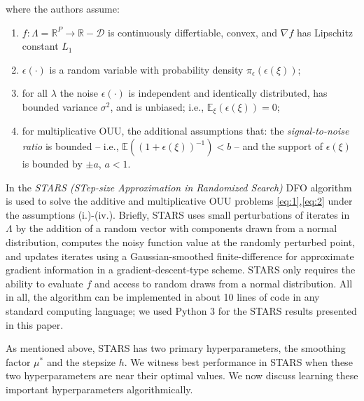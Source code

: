 \documentclass{amsart}
\newcommand{\D}{\mathcal{D}}
\newcommand{\R}{\mathbb{R}}
\begin{document}
\noindent where the authors assume:

\begin{enumerate}[(i.)]

\item $f: \Lambda=\R^P \to \R-\D$ is continuously differtiable, convex, and $\nabla f$ has Lipschitz constant $L_1$

\item $\epsilon(\cdot)$ is a random variable with probability density $\pi_{\epsilon}(\epsilon(\xi))$;

\item for all $\lambda$ the noise $\epsilon(\cdot)$ is independent and identically distributed, has bounded variance $\sigma^2$, and is unbiased; i.e., $\mathbb{E}_\xi (\epsilon(\xi))=0$;

\item for multiplicative OUU, the additional assumptions that: the \textit{signal-to-noise ratio} is bounded -- i.e., $\mathbb{E}((1+\epsilon(\xi))^{-1})<b$ -- and the support of $\epsilon(\xi)$ is bounded by $\pm a$, $a<1.$

\end{enumerate}




In \cite{CW} the \textit{STARS (STep-size Approximation in Randomized Search)} DFO algorithm is used to solve the additive and multiplicative OUU problems \eqref{eq:1},\eqref{eq:2} under the  assumptions (i.)-(iv.). Briefly, STARS uses small perturbations of iterates in $\Lambda$ by the addition of a random vector with components drawn from a normal distribution, computes the noisy function value at the randomly perturbed point, and updates iterates using a Gaussian-smoothed finite-difference for approximate gradient information in a gradient-descent-type scheme. STARS only  requires the ability to evaluate $f$ and access to random draws from a normal distribution. All in all, the algorithm can be implemented in about 10 lines of code in any standard computing language; we used Python 3 for the STARS results presented in this paper. 

As mentioned above, STARS has two primary hyperparameters, the smoothing factor $\mu^*$ and the stepsize $h$.
We witness best performance in STARS when these two hyperparameters are %
near their optimal values. We now discuss learning these important hyperparameters algorithmically.
\end{document}
